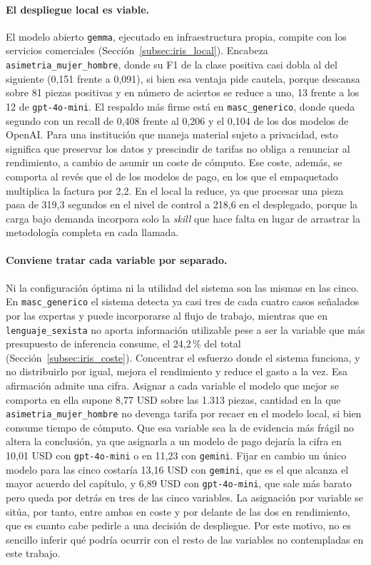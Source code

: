 \paragraph{El despliegue local es viable.} El modelo abierto \texttt{gemma},
ejecutado en infraestructura propia, compite con los servicios comerciales
(Sección~\ref{subsec:iris_local}). Encabeza \texttt{asimetria\_mujer\_hombre}, donde su
F1 de la clase positiva casi dobla al del siguiente (0,151 frente a 0,091), si bien esa
ventaja pide cautela, porque descansa sobre 81 piezas positivas y en número de aciertos
se reduce a uno, 13 frente a los 12 de \texttt{gpt-4o-mini}. El respaldo más firme está
en \texttt{masc\_generico}, donde queda segundo con un recall de 0,408 frente al 0,206
y el 0,104 de los dos modelos de OpenAI. Para una institución que maneja material sujeto
a privacidad, esto significa que preservar los datos y prescindir de tarifas no
obliga a renunciar al rendimiento, a cambio de asumir un coste de cómputo. Ese coste,
además, se comporta al revés que el de los modelos de pago, en los que el empaquetado
multiplica la factura por 2,2. En el local la reduce, ya que procesar una pieza pasa
de 319,3 segundos en el nivel de control a 218,6 en el desplegado, porque la carga bajo
demanda incorpora solo la \textit{skill} que hace falta en lugar de arrastrar la
metodología completa en cada llamada.

\paragraph{Conviene tratar cada variable por separado.} Ni la configuración óptima
ni la utilidad del sistema son las mismas en las cinco. En
\texttt{masc\_generico} el sistema detecta ya casi tres de cada cuatro casos
señalados por las expertas y puede incorporarse al flujo de trabajo, mientras que en
\texttt{lenguaje\_sexista} no aporta información utilizable pese a ser la variable
que más presupuesto de inferencia consume, el 24,2\,\% del total
(Sección~\ref{subsec:iris_coste}).
Concentrar el esfuerzo donde el sistema funciona, y no distribuirlo por igual,
mejora el rendimiento y reduce el gasto a la vez. Esa afirmación admite una cifra.
Asignar a cada variable el modelo que mejor se comporta en ella supone 8,77 USD sobre
las 1.313 piezas, cantidad en la que \texttt{asimetria\_mujer\_hombre} no devenga
tarifa por recaer en el modelo local, si bien consume tiempo de cómputo. Que esa
variable sea la de evidencia más frágil no altera la conclusión, ya que asignarla a un
modelo de pago dejaría la cifra en 10,01 USD con \texttt{gpt-4o-mini} o en 11,23 con
\texttt{gemini}. Fijar en
cambio un único modelo para las cinco costaría 13,16 USD con \texttt{gemini}, que es el
que alcanza el mayor acuerdo del capítulo, y 6,89 USD con \texttt{gpt-4o-mini}, que
sale más barato pero queda
por detrás en tres de las cinco variables. La asignación por variable se sitúa, por
tanto, entre ambas en coste y por delante de las dos en rendimiento, que es cuanto cabe
pedirle a una decisión de despliegue. Por este motivo, no es sencillo inferir qué podría ocurrir con el resto de las variables no contempladas en este trabajo.

